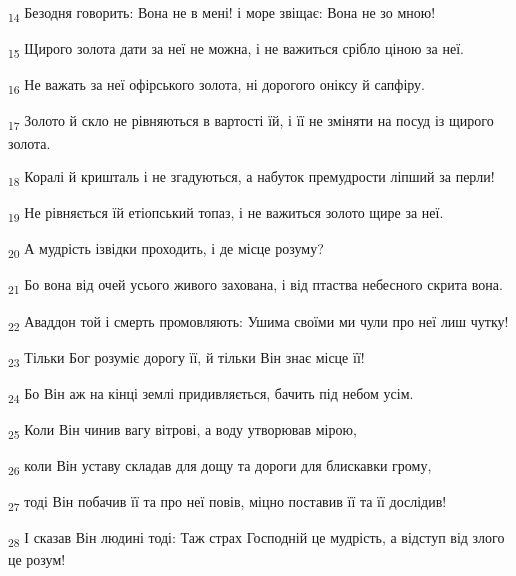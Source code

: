 \begin{tcolorbox}
\textsubscript{14} Безодня говорить: Вона не в мені! і море звіщає: Вона не зо мною!
\end{tcolorbox}
\begin{tcolorbox}
\textsubscript{15} Щирого золота дати за неї не можна, і не важиться срібло ціною за неї.
\end{tcolorbox}
\begin{tcolorbox}
\textsubscript{16} Не важать за неї офірського золота, ні дорогого оніксу й сапфіру.
\end{tcolorbox}
\begin{tcolorbox}
\textsubscript{17} Золото й скло не рівняються в вартості їй, і її не зміняти на посуд із щирого золота.
\end{tcolorbox}
\begin{tcolorbox}
\textsubscript{18} Коралі й кришталь і не згадуються, а набуток премудрости ліпший за перли!
\end{tcolorbox}
\begin{tcolorbox}
\textsubscript{19} Не рівняється їй етіопський топаз, і не важиться золото щире за неї.
\end{tcolorbox}
\begin{tcolorbox}
\textsubscript{20} А мудрість ізвідки проходить, і де місце розуму?
\end{tcolorbox}
\begin{tcolorbox}
\textsubscript{21} Бо вона від очей усього живого захована, і від птаства небесного скрита вона.
\end{tcolorbox}
\begin{tcolorbox}
\textsubscript{22} Аваддон той і смерть промовляють: Ушима своїми ми чули про неї лиш чутку!
\end{tcolorbox}
\begin{tcolorbox}
\textsubscript{23} Тільки Бог розуміє дорогу її, й тільки Він знає місце її!
\end{tcolorbox}
\begin{tcolorbox}
\textsubscript{24} Бо Він аж на кінці землі придивляється, бачить під небом усім.
\end{tcolorbox}
\begin{tcolorbox}
\textsubscript{25} Коли Він чинив вагу вітрові, а воду утворював мірою,
\end{tcolorbox}
\begin{tcolorbox}
\textsubscript{26} коли Він уставу складав для дощу та дороги для блискавки грому,
\end{tcolorbox}
\begin{tcolorbox}
\textsubscript{27} тоді Він побачив її та про неї повів, міцно поставив її та її дослідив!
\end{tcolorbox}
\begin{tcolorbox}
\textsubscript{28} І сказав Він людині тоді: Таж страх Господній це мудрість, а відступ від злого це розум!
\end{tcolorbox}
